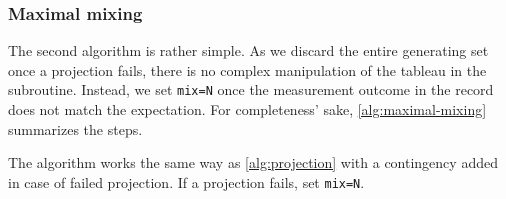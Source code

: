 \subsubsection{Maximal mixing}
The second algorithm is rather simple. As we discard the entire generating set
once a projection fails, there is no complex manipulation of the tableau in the
subroutine. Instead, we set \verb|mix=N| once the measurement outcome in the
record does not match the expectation. For completeness' sake,
\cref{alg:maximal-mixing} summarizes the steps.

\begin{alg}\label{alg:maximal-mixing}
  The algorithm works the same way as \cref{alg:projection} with a contingency
  added in case of failed projection. If a projection fails, set \verb|mix=N|.
\end{alg}

%  
